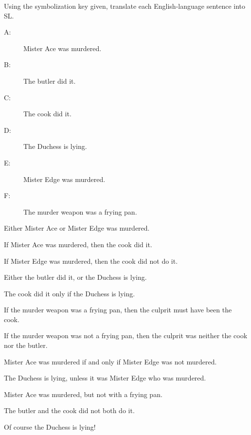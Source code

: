 
\noindent\problempart Using the symbolization key given, translate each English-language sentence into SL.
\begin{description}
\item[A:] Mister Ace was murdered.
\item[B:] The butler did it.
\item[C:] The cook did it.
\item[D:] The Duchess is lying.
\item[E:] Mister Edge was murdered.
\item[F:] The murder weapon was a frying pan.
\end{description}
\begin{exercises}
\item Either Mister Ace or Mister Edge was murdered. %
\item If Mister Ace was murdered, then the cook did it. %
\item If Mister Edge was murdered, then the cook did not do it. %
\item Either the butler did it, or the Duchess is lying. %
\item The cook did it only if the Duchess is lying. %
\item If the murder weapon was a frying pan, then the culprit must have been the cook. %
\item If the murder weapon was not a frying pan, then the culprit was neither the cook nor the butler. %
\item Mister Ace was murdered if and only if Mister Edge was not murdered. %
\item The Duchess is lying, unless it was Mister Edge who was murdered. %
\item Mister Ace was murdered, but not with a frying pan. %
\item The butler and the cook did not both do it. %
\item Of course the Duchess is lying! %
\end{exercises}

